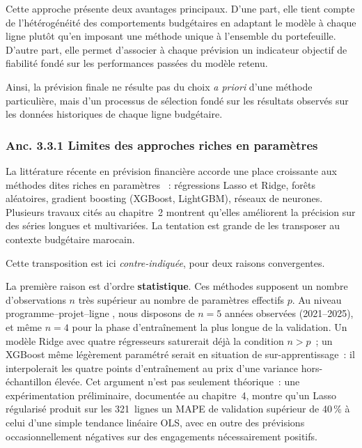 Cette approche pr\'esente deux avantages principaux. D'une part, elle tient
compte de l'h\'et\'erog\'en\'eit\'e des comportements budg\'etaires en adaptant le
mod\`ele \`a chaque ligne plut\^ot qu'en imposant une m\'ethode unique \`a
l'ensemble du portefeuille. D'autre part, elle permet d'associer \`a chaque
pr\'evision un indicateur objectif de fiabilit\'e fond\'e sur les performances
pass\'ees du mod\`ele retenu.

Ainsi, la pr\'evision finale ne r\'esulte pas du choix \textit{a priori} d'une
m\'ethode particuli\`ere, mais d'un processus de s\'election fond\'e sur les
r\'esultats observ\'es sur les donn\'ees historiques de chaque ligne
budg\'etaire.

\iffalse
\subsubsection*{Anc. 3.3.1 \quad Limites des approches riches en param\`etres}

La litt\'erature r\'ecente en pr\'evision financi\`ere accorde une place
croissante aux m\'ethodes dites \og riches en param\`etres \fg{}~: r\'egressions
Lasso et Ridge, for\^ets al\'eatoires, gradient boosting (XGBoost, LightGBM),
r\'eseaux de neurones. Plusieurs travaux cit\'es au chapitre~2 montrent qu'elles
am\'eliorent la pr\'ecision sur des s\'eries longues et multivari\'ees. La
tentation est grande de les transposer au contexte budg\'etaire marocain.

Cette transposition est ici \emph{contre-indiqu\'ee}, pour deux raisons
convergentes.

La premi\`ere raison est d'ordre \textbf{statistique}. Ces m\'ethodes supposent
un nombre d'observations $n$ tr\`es sup\'erieur au nombre de param\`etres
effectifs $p$. Au niveau \og programme--projet--ligne \fg{}, nous disposons de
$n=5$ ann\'ees observ\'ees (2021--2025), et m\^eme $n=4$ pour la phase
d'entra\^inement la plus longue de la validation. Un mod\`ele Ridge avec
quatre r\'egresseurs saturerait d\'ej\`a la condition $n>p$~; un XGBoost
m\^eme l\'eg\`erement param\'etr\'e serait en situation de sur-apprentissage~:
il interpolerait les quatre points d'entra\^inement au prix d'une variance
hors-\'echantillon \'elev\'ee. Cet argument n'est pas seulement th\'eorique~:
une exp\'erimentation pr\'eliminaire, document\'ee au chapitre~4, montre qu'un
Lasso r\'egularis\'e produit sur les 321~lignes un MAPE de validation
sup\'erieur de 40\,\% \`a celui d'une simple tendance lin\'eaire OLS, avec en
outre des pr\'evisions occasionnellement n\'egatives sur des engagements
n\'ecessairement positifs.

